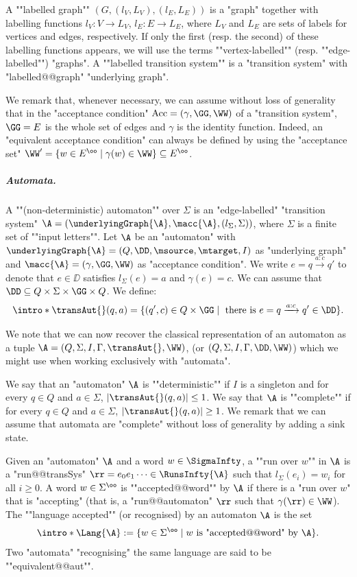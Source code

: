 \documentclass[10pt,a4paper]{amsart}
\renewcommand{\gg}{\gamma}
\renewcommand{\SS}{\Sigma}
\newcommand{\re}[1]{\xrightarrow{#1}}
\begin{document}
 
\AP A ""labelled graph"" $\left(G, (l_V, L_V), (l_E, L_E)\right)$ is a "graph"  together with labelling functions $l_V: V \rightarrow L_V$, $l_E: E \rightarrow L_E$, where $L_V$ and $L_E$ are sets of labels for vertices and edges, respectively. If only the first (resp. the second) of these labelling functions appears, we will use the terms ""vertex-labelled"" (resp. ""edge-labelled"") "graphs". 
A ""labelled transition system"" is a "transition system" with "labelled@@graph" "underlying graph".

\begin{remark}\label{rmk:colours=edges}
	We remark that, whenever necessary, we can assume without loss of generality that in the "acceptance condition" $\mathrm{Acc} = (\gg, \GG, \WW)$ of a "transition system",  $\GG=E$ is the whole set of edges and $\gamma$ is the identity function.
	Indeed, an "equivalent acceptance condition" can always be defined by using the "acceptance set" $\WW' = \{w\in E^\oo \mid \gg(w)\in \WW\} \subseteq E^\oo$.
\end{remark}

\subparagraph*{Automata.}
A ""(non-deterministic) automaton"" over $\SS$ is an "edge-labelled" "transition system" $\A = (\underlyingGraph{\A}, \macc{\A}, (l_\SS, \SS))$, where $\SS$ is a finite set of ""input letters"".
Let $\A$ be an "automaton" with $\underlyingGraph{\A} = (Q,\DD,\msource, \mtarget, I)$ as "underlying graph" and $\macc{\A} = (\gg, \GG, \WW)$ as "acceptance condition".
We write $e = q\re{a:c}q'$ to denote that $e\in \DD$ satisfies $l_\SS(e) = a$ and $\gg(e) = c$.
We can assume that $\DD\subseteq Q\times \SS\times \GG \times Q$.
\AP We define:
 \[\intro*\transAut{}(q, a) = \{ (q', c)\in Q\times \GG \mid \text{ there is } e = q\re{a:c} q' \in \DD\}.\]%

We note that we can now recover the classical representation of an automaton as a tuple $\A = (Q,\Sigma, I, \Gamma, \transAut{}, \WW)$, (or $(Q,\Sigma, I, \Gamma, \DD, \WW)$) which we might use when working exclusively with "automata".

\AP We say that an "automaton" $\A$ is ""deterministic"" if $I$ is a singleton and for every $q\in Q$ and $a\in \Sigma$, $|\transAut{}(q,a)| \leq 1$. 
\AP We say that $\A$ is  ""complete""
if for every $q\in Q$ and $a\in \Sigma$, $|\transAut{}(q,a)| \geq 1$. 
We remark that we can assume that automata are "complete" without loss of generality by adding a sink state.


\AP Given an "automaton" $\A$ and a word $w\in \SigmaInfty$, a  ""run over $w$"" in $\A$ is a "run@@transSys" $\rr = e_0e_1\dots  \in \RunsInfty{\A}$ such that $l_\SS(e_i) = w_i$ for all $i \geq 0$.
\AP A word $w\in \SS^\oo$ is  ""accepted@@word"" by $\A$ if there is a "run over $w$" that is "accepting" (that is, a "run@@automaton" $\rr$ such that $\gg(\rr)\in \WW$).	
\AP The ""language accepted"" (or recognised) by an automaton $\A$ is the set 
\[ \intro*\Lang{\A}:= \{ w\in \Sigma^\oo \mid w \text{ is "accepted@@word" by } \A \}.\]
\AP Two "automata" "recognising" the same language are said to be ""equivalent@@aut"".
\end{document}
